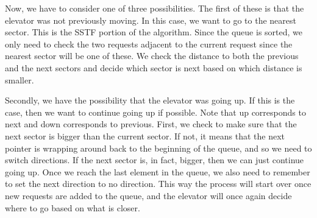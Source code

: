 \documentclass[letterpaper,10pt,titlepage,fleqn]{article}
\begin{document}
Now, we have to consider one of three possibilities. The first of these is that the elevator was not previously moving. In this case, we want to go to the nearest sector. This is the SSTF portion of the algorithm. Since the queue is sorted, we only need to check the two requests adjacent to the current request since the nearest sector will be one of these. We check the distance to both the previous and the next sectors and decide which sector is next based on which distance is smaller.

Secondly, we have the possibility that the elevator was going up. If this is the case, then we want to continue going up if possible. Note that up corresponds to next and down corresponds to previous. First, we check to make sure that the next sector is bigger than the current sector. If not, it means that the next pointer is wrapping around back to the beginning of the queue, and so we need to switch directions. If the next sector is, in fact, bigger, then we can just continue going up. Once we reach the last element in the queue, we also need to remember to set the next direction to no direction. This way the process will start over once new requests are added to the queue, and the elevator will once again decide where to go based on what is closer.
\end{document}

